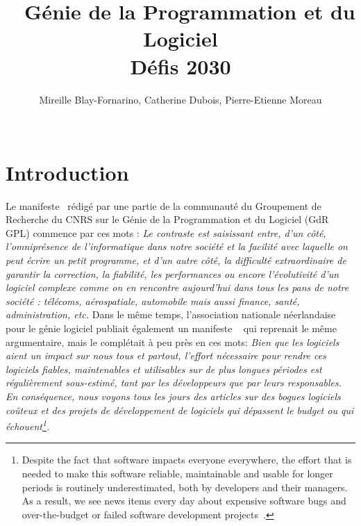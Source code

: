 \documentclass[11pt]{article}
\title{{\GDR}~ Génie de la Programmation et du Logiciel\\ 
Défis 2030}
\author{Mireille Blay-Fornarino, Catherine Dubois, Pierre-Etienne Moreau\\
\\
}
\newcommand{\GDR}{GdR}
\begin{document}
\maketitle
\tableofcontents
\section{Introduction}

Le manifeste~\cite{manifeste} rédigé par une partie de la communauté du Groupement de Recherche du CNRS sur le Génie de la Programmation et du Logiciel ({\GDR}~ GPL) commence par ces mots : \emph{Le contraste est saisissant entre, d’un côté, l’omniprésence de l’informatique dans notre
société et la facilité avec laquelle on peut écrire un petit programme, et d’un autre côté, la difficulté extraordinaire de garantir la correction, la fiabilité, les performances ou encore
l’évolutivité d’un logiciel complexe comme on en rencontre aujourd’hui dans tous les pans
de notre société : télécoms, aérospatiale, automobile mais aussi finance, santé,
administration, etc. }
Dans le même temps, l'association nationale néerlandaise pour le génie logiciel publiait également un manifeste ~\cite{Nederland2019} qui reprenait le même argumentaire, mais le complétait à peu près en ces mots:  \emph{Bien que les logiciels aient un impact sur nous tous et partout, l'effort nécessaire pour rendre ces logiciels fiables, maintenables et utilisables sur de plus longues périodes est régulièrement sous-estimé, tant par les développeurs que par leurs responsables. En conséquence, nous voyons tous les jours des articles sur des bogues logiciels coûteux et des projets de développement de logiciels qui dépassent le budget ou qui échouent\footnote{Despite the fact that software impacts everyone everywhere, the effort that is needed to make this software reliable,
maintainable and usable for longer periods is routinely underestimated, both by developers and their managers. As a result,
we see news items every day about expensive software bugs and over-the-budget or failed software development projects~\cite{Nederland2019}.}.}
\end{document}
